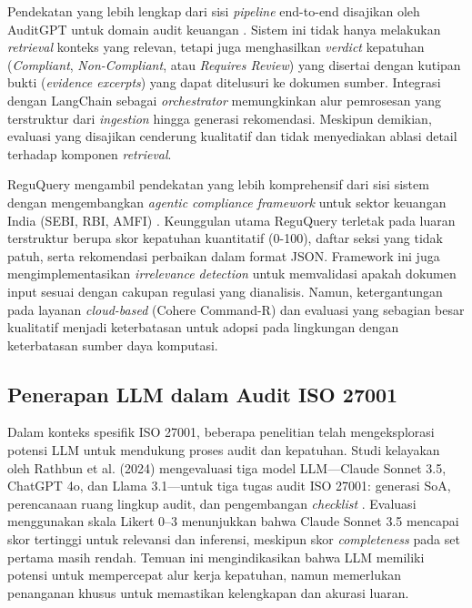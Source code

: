\documentclass[bachelor,bahasa]{thesisdtetiugm}
\begin{document}
Pendekatan yang lebih lengkap dari sisi \textit{pipeline} end-to-end disajikan oleh AuditGPT untuk domain audit keuangan \cite{auditgpt2025}. Sistem ini tidak hanya melakukan \textit{retrieval} konteks yang relevan, tetapi juga menghasilkan \textit{verdict} kepatuhan (\textit{Compliant}, \textit{Non-Compliant}, atau \textit{Requires Review}) yang disertai dengan kutipan bukti (\textit{evidence excerpts}) yang dapat ditelusuri ke dokumen sumber. Integrasi dengan LangChain sebagai \textit{orchestrator} memungkinkan alur pemrosesan yang terstruktur dari \textit{ingestion} hingga generasi rekomendasi. Meskipun demikian, evaluasi yang disajikan cenderung kualitatif dan tidak menyediakan ablasi detail terhadap komponen \textit{retrieval}.

ReguQuery mengambil pendekatan yang lebih komprehensif dari sisi sistem dengan mengembangkan \textit{agentic compliance framework} untuk sektor keuangan India (SEBI, RBI, AMFI) \cite{reguquery2025}. Keunggulan utama ReguQuery terletak pada luaran terstruktur berupa skor kepatuhan kuantitatif (0-100), daftar seksi yang tidak patuh, serta rekomendasi perbaikan dalam format JSON. Framework ini juga mengimplementasikan \textit{irrelevance detection} untuk memvalidasi apakah dokumen input sesuai dengan cakupan regulasi yang dianalisis. Namun, ketergantungan pada layanan \textit{cloud-based} (Cohere Command-R) dan evaluasi yang sebagian besar kualitatif menjadi keterbatasan untuk adopsi pada lingkungan dengan keterbatasan sumber daya komputasi.

\subsection{Penerapan LLM dalam Audit ISO 27001}

Dalam konteks spesifik ISO 27001, beberapa penelitian telah mengeksplorasi potensi LLM untuk mendukung proses audit dan kepatuhan. Studi kelayakan oleh Rathbun et al. (2024) mengevaluasi tiga model LLM---Claude Sonnet 3.5, ChatGPT 4o, dan Llama 3.1---untuk tiga tugas audit ISO 27001: generasi SoA, perencanaan ruang lingkup audit, dan pengembangan \textit{checklist} \cite{llmiso27001pilot}. Evaluasi menggunakan skala Likert 0--3 menunjukkan bahwa Claude Sonnet 3.5 mencapai skor tertinggi untuk relevansi dan inferensi, meskipun skor \textit{completeness} pada set pertama masih rendah. Temuan ini mengindikasikan bahwa LLM memiliki potensi untuk mempercepat alur kerja kepatuhan, namun memerlukan penanganan khusus untuk memastikan kelengkapan dan akurasi luaran.
\end{document}
